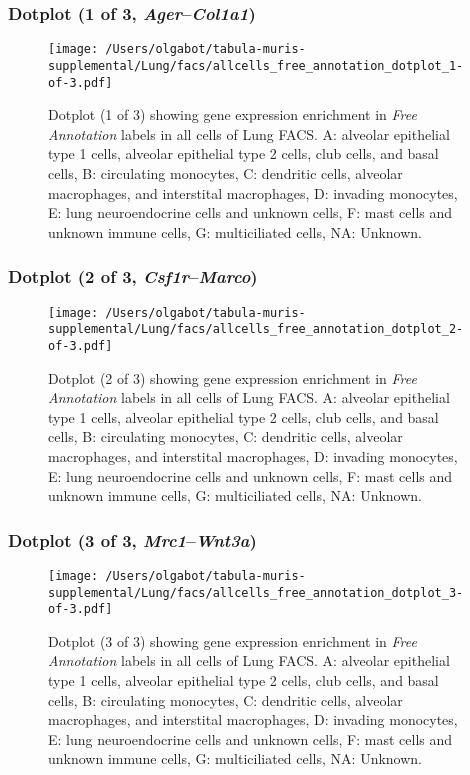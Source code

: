 \clearpage

\subsubsection{Dotplot (1 of 3, \emph{Ager}--\emph{Col1a1})}
\begin{figure}[h]
\centering
\texttt{[image: /Users/olgabot/tabula-muris-supplemental/Lung/facs/allcells\_free\_annotation\_dotplot\_1-of-3.pdf]}

\caption{ Dotplot (1 of 3)  showing gene expression enrichment in \emph{Free Annotation} labels in all cells of Lung FACS. A: alveolar epithelial type 1 cells, alveolar epithelial type 2 cells, club cells, and basal cells, B: circulating monocytes, C: dendritic cells, alveolar macrophages, and interstital macrophages, D: invading monocytes, E: lung neuroendocrine cells and unknown cells, F: mast cells and unknown immune cells, G: multiciliated cells, NA: Unknown.}
\end{figure}


\clearpage

\subsubsection{Dotplot (2 of 3, \emph{Csf1r}--\emph{Marco})}
\begin{figure}[h]
\centering
\texttt{[image: /Users/olgabot/tabula-muris-supplemental/Lung/facs/allcells\_free\_annotation\_dotplot\_2-of-3.pdf]}

\caption{ Dotplot (2 of 3)  showing gene expression enrichment in \emph{Free Annotation} labels in all cells of Lung FACS. A: alveolar epithelial type 1 cells, alveolar epithelial type 2 cells, club cells, and basal cells, B: circulating monocytes, C: dendritic cells, alveolar macrophages, and interstital macrophages, D: invading monocytes, E: lung neuroendocrine cells and unknown cells, F: mast cells and unknown immune cells, G: multiciliated cells, NA: Unknown.}
\end{figure}


\clearpage

\subsubsection{Dotplot (3 of 3, \emph{Mrc1}--\emph{Wnt3a})}
\begin{figure}[h]
\centering
\texttt{[image: /Users/olgabot/tabula-muris-supplemental/Lung/facs/allcells\_free\_annotation\_dotplot\_3-of-3.pdf]}

\caption{ Dotplot (3 of 3)  showing gene expression enrichment in \emph{Free Annotation} labels in all cells of Lung FACS. A: alveolar epithelial type 1 cells, alveolar epithelial type 2 cells, club cells, and basal cells, B: circulating monocytes, C: dendritic cells, alveolar macrophages, and interstital macrophages, D: invading monocytes, E: lung neuroendocrine cells and unknown cells, F: mast cells and unknown immune cells, G: multiciliated cells, NA: Unknown.}
\end{figure}

